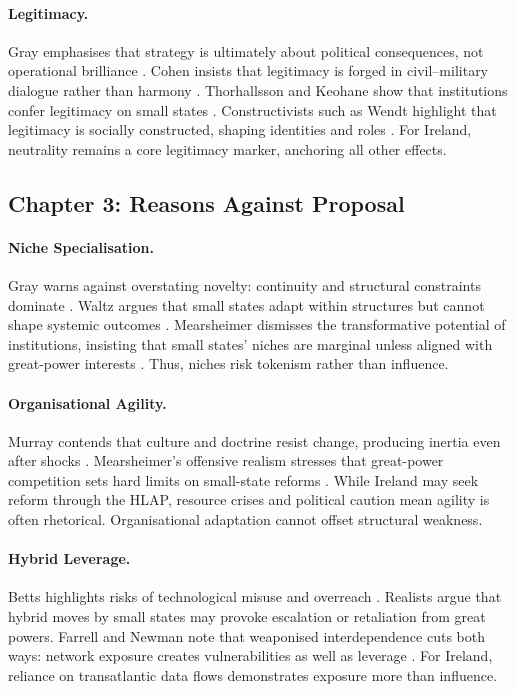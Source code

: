 \paragraph{Legitimacy.}  
Gray emphasises that strategy is ultimately about political consequences, not operational brilliance \parencite{GRAY_2018}. Cohen insists that legitimacy is forged in civil–military dialogue rather than harmony \parencite{COHEN_2002}. Thorhallsson and Keohane show that institutions confer legitimacy on small states \parencite{THORHALLSSON_2006, KEOHANE_1988}. Constructivists such as Wendt highlight that legitimacy is socially constructed, shaping identities and roles \parencite{WENDT_1999}. For Ireland, neutrality remains a core legitimacy marker, anchoring all other effects.

\subsection*{Chapter 3: Reasons Against Proposal}
\paragraph{Niche Specialisation.}  
Gray warns against overstating novelty: continuity and structural constraints dominate \parencite{GRAY_2005}. Waltz argues that small states adapt within structures but cannot shape systemic outcomes \parencite{WALTZ_1979}. Mearsheimer dismisses the transformative potential of institutions, insisting that small states’ niches are marginal unless aligned with great-power interests \parencite{MEARSHEIMER_1994}. Thus, niches risk tokenism rather than influence.

\paragraph{Organisational Agility.}  
Murray contends that culture and doctrine resist change, producing inertia even after shocks \parencite{MURRAY_2001}. Mearsheimer’s offensive realism stresses that great-power competition sets hard limits on small-state reforms \parencite{MEARSHEIMER_2019}. While Ireland may seek reform through the HLAP, resource crises and political caution mean agility is often rhetorical. Organisational adaptation cannot offset structural weakness.

\paragraph{Hybrid Leverage.}  
Betts highlights risks of technological misuse and overreach \parencite{BETTS_1996}. Realists argue that hybrid moves by small states may provoke escalation or retaliation from great powers. Farrell and Newman note that weaponised interdependence cuts both ways: network exposure creates vulnerabilities as well as leverage \parencite{FARRELL_2019}. For Ireland, reliance on transatlantic data flows demonstrates exposure more than influence.

